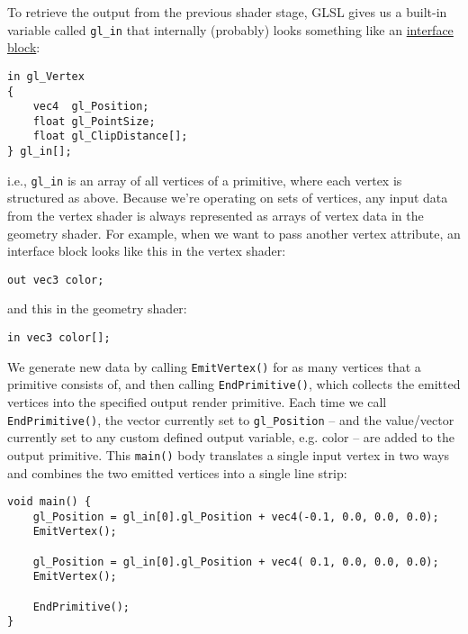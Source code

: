 \documentclass[8pt, table, xcdraw]{article}%
\begin{document}
\begin{enumerate}
    To retrieve the output from the previous shader stage, GLSL gives us a built-in variable called \lstinline{gl_in} that internally (probably) looks something like an \hyperref[interface_block]{interface block}:

    \begin{lstlisting}
in gl_Vertex
{
    vec4  gl_Position;
    float gl_PointSize;
    float gl_ClipDistance[];
} gl_in[];
    \end{lstlisting}

    i.e., \lstinline{gl_in} is an array of all vertices of a primitive, where each vertex is structured as above. Because we're operating on sets of vertices, any input data from the vertex shader is always represented as arrays of vertex data in the geometry shader. For example, when we want to pass another vertex attribute, an interface block looks like this in the vertex shader:

    \begin{lstlisting}
out vec3 color;
    \end{lstlisting}

    and this in the geometry shader:

    \begin{lstlisting}
in vec3 color[];
    \end{lstlisting}
    
    We generate new data by calling \lstinline{EmitVertex()} for as many vertices that a primitive consists of, and then calling \lstinline{EndPrimitive()}, which collects the emitted vertices into the specified output render primitive. Each time we call \lstinline{EndPrimitive()}, the vector currently set to \lstinline{gl_Position} -- and the value/vector currently set to any custom defined output variable, e.g. color -- are added to the output primitive. This \lstinline{main()} body translates a single input vertex in two ways and combines the two emitted vertices into a single line strip:

    \begin{lstlisting}
void main() {    
    gl_Position = gl_in[0].gl_Position + vec4(-0.1, 0.0, 0.0, 0.0); 
    EmitVertex();

    gl_Position = gl_in[0].gl_Position + vec4( 0.1, 0.0, 0.0, 0.0);
    EmitVertex();
    
    EndPrimitive();
}
    \end{lstlisting}
    

\end{enumerate}
\end{document}
